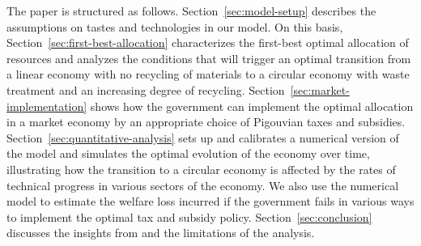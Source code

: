 The paper is structured as follows. Section~\ref{sec:model-setup} describes the assumptions on tastes and technologies in our model. On this basis, Section~\ref{sec:first-best-allocation} characterizes the first-best optimal allocation of resources and analyzes the conditions that will trigger an optimal transition from a linear economy with no recycling of materials to a circular economy with waste treatment and an increasing degree of recycling. Section~\ref{sec:market-implementation} shows how the government can implement the optimal allocation in a market economy by an appropriate choice of Pigouvian taxes and subsidies. Section~\ref{sec:quantitative-analysis} sets up and calibrates a numerical version of the model and simulates the optimal evolution of the economy over time, illustrating how the transition to a circular economy is affected by the rates of technical progress in various sectors of the economy. We also use the numerical model to estimate the welfare loss incurred if the government fails in various ways to implement the optimal tax and subsidy policy. Section~\ref{sec:conclusion} discusses the insights from and the limitations of the analysis.

